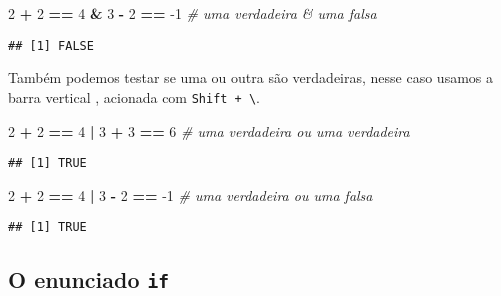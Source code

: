 \documentclass[]{article}
\newenvironment{Shaded}{\begin{snugshade}}{\end{snugshade}}
\newcommand{\CommentTok}[1]{\textcolor[rgb]{0.56,0.35,0.01}{\textit{#1}}}
\newcommand{\DecValTok}[1]{\textcolor[rgb]{0.00,0.00,0.81}{#1}}
\newcommand{\OperatorTok}[1]{\textcolor[rgb]{0.81,0.36,0.00}{\textbf{#1}}}
\newcommand{\StringTok}[1]{\textcolor[rgb]{0.31,0.60,0.02}{#1}}
\begin{document}
\begin{Shaded}
\begin{Highlighting}[]
\DecValTok{2} \OperatorTok{+}\StringTok{ }\DecValTok{2} \OperatorTok{==}\StringTok{ }\DecValTok{4} \OperatorTok{&}\StringTok{ }\DecValTok{3} \OperatorTok{-}\StringTok{ }\DecValTok{2} \OperatorTok{==}\StringTok{ }\DecValTok{-1} \CommentTok{# uma verdadeira & uma falsa}
\end{Highlighting}
\end{Shaded}

\begin{verbatim}
## [1] FALSE
\end{verbatim}

Também podemos testar se uma ou outra são verdadeiras, nesse caso usamos
a barra vertical \texttt{\textbar{}}, acionada com
\texttt{Shift\ +\ \textbackslash{}}.

\begin{Shaded}
\begin{Highlighting}[]
\DecValTok{2} \OperatorTok{+}\StringTok{ }\DecValTok{2} \OperatorTok{==}\StringTok{ }\DecValTok{4} \OperatorTok{|}\StringTok{ }\DecValTok{3} \OperatorTok{+}\StringTok{ }\DecValTok{3} \OperatorTok{==}\StringTok{ }\DecValTok{6} \CommentTok{# uma verdadeira ou uma verdadeira}
\end{Highlighting}
\end{Shaded}

\begin{verbatim}
## [1] TRUE
\end{verbatim}

\begin{Shaded}
\begin{Highlighting}[]
\DecValTok{2} \OperatorTok{+}\StringTok{ }\DecValTok{2} \OperatorTok{==}\StringTok{ }\DecValTok{4} \OperatorTok{|}\StringTok{ }\DecValTok{3} \OperatorTok{-}\StringTok{ }\DecValTok{2} \OperatorTok{==}\StringTok{ }\DecValTok{-1} \CommentTok{# uma verdadeira ou uma falsa}
\end{Highlighting}
\end{Shaded}

\begin{verbatim}
## [1] TRUE
\end{verbatim}

\hypertarget{o-enunciado-if}{%
\subsection{\texorpdfstring{O enunciado
\texttt{if}}{O enunciado if}}\label{o-enunciado-if}}
\end{document}
